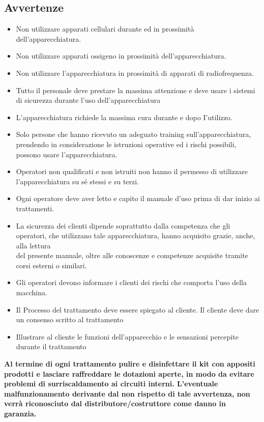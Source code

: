 \documentclass[a4paper]{article}
\begin{document}
\subsection{Avvertenze}
\begin{itemize}
  \item Non utilizzare apparati cellulari durante ed in prossimità dell'apparecchiatura.
  \item Non utilizzare apparati ossigeno in prossimità dell'apparecchiatura.
  \item Non utilizzare l'apparecchiatura in prossimità di apparati di radiofrequenza.
  \item Tutto il personale deve prestare la massima attenzione e deve usare i sistemi di sicurezza durante l'uso dell'apparecchiatura
  \item L'apparecchiatura richiede la massima cura durante e dopo I'utilizzo.
  \item Solo persone che hanno ricevuto un adeguato training sull'apparecchiatura, prendendo in considerazione le istruzioni operative ed i rischi possibili, possono usare l'apparecchiatura.
  \item Operatori non qualificati e non istruiti non hanno il permesso di utilizzare l'apparecchiatura su sé stessi e su terzi.
  \item Ogni operatore deve aver letto e capito il manuale d'uso prima di dar inizio ai trattamenti.
  \item La sicurezza dei clienti dipende soprattutto dalla competenza che gli operatori, che utilizzano tale apparecchiatura, hanno acquisito grazie, anche, alla lettura\\
del presente manuale, oltre alle conoscenze e competenze acquisite tramite corsi esterni o similari.
  \item Gli operatori devono informare i clienti dei rischi che comporta l'uso della macchina.
  \item Il Processo del trattamento deve essere spiegato al cliente. Il cliente deve dare un consenso scritto al trattamento
  \item Illustrare al cliente le funzioni dell'apparecchio e le sensazioni percepite durante il trattamento
\end{itemize}

\textbf{Al termine di ogni trattamento pulire e disinfettare il kit con appositi prodotti e lasciare raffreddare le dotazioni aperte, in modo da evitare problemi di surriscaldamento ai circuiti interni. L'eventuale malfunzionamento derivante dal non rispetto di tale avvertenza, non verrà riconosciuto dal distributore/costruttore come danno in garanzia.}
\end{document}
